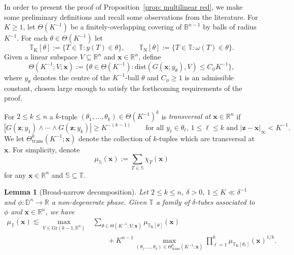 \documentclass[reqno]{amsart}
\numberwithin{equation}{section}
\newcommand{\B}{\mathbb{B}}
\newcommand{\D}{\mathbb{D}}
\newcommand{\R}{\mathbb{R}}
\newcommand{\T}{\mathbb{T}}
\newcommand{\bx}{\mathbf{x}}
\newcommand{\bz}{\mathbf{z}}
\theoremstyle{plain}
\newtheorem{lemma}[theorem]{Lemma}
\theoremstyle{definition}
\newcommand{\trans}{\mathrm{trans}}
\newcommand{\dist}{\mathrm{dist}}
\begin{document}
In order to present the proof of Proposition~\ref{prop: multilinear red}, we make some preliminary definitions and recall some observations from the literature. For $K \geq 1$, let $\Theta(K^{-1})$ be a finitely-overlapping covering of $\B^{n-1}$ by balls of radius $K^{-1}$. For each $\theta \in \Theta(K^{-1})$ let
\begin{equation*}
    \T_{\mathrm{K}}[\theta] := \big\{ T \in \T : y(T) \in \theta \big\}, \qquad \T_{\mathrm{N}}[\theta] := \big\{ T \in \T : \omega(T) \in \theta \big\}.
\end{equation*}
Given a linear subspace $V \subseteq \R^n$ and $\bx \in \R^n$, define
\begin{equation}\label{eq: V aligned caps}
    \Theta(K^{-1};V; \bx) := \big\{ \theta \in \Theta(K^{-1}) : \dist(G(\bx ;y_{\theta}), V) \leq C_{\phi} K^{-1} \big\},
\end{equation}
where $y_{\theta}$ denotes the centre of the $K^{-1}$-ball $\theta$ and $C_{\phi} \geq 1$ is an admissible constant, chosen large enough to satisfy the forthcoming requirements of the proof. 

For $2 \leq k \leq n$ a $k$-tuple $(\theta_1, \dots, \theta_k) \in \Theta(K^{-1})^k$ is \textit{transversal at $\bx \in \R^n$} if 
\begin{equation*}
    |G(\bz;y_1) \wedge \cdots \wedge G(\bz;y_k)| \geq K^{-(k-1)} \qquad \textrm{for all $y_{\ell} \in \theta_{\ell}$, $1 \leq \ell \leq k$ and $|\bz - \bx|_{\infty} < K^{-1}$.}
\end{equation*}
We let $\Theta^k_{\trans}(K^{-1}; \bx)$ denote the collection of $k$-tuples which are transversal at $\bx$. For simplicity, denote
\begin{equation*}
\mu_\mathbb{S}(\bx):=\sum_{T\in\mathbb{S}}\chi_T(\bx)
\end{equation*}
for any $\bx\in\R^n$ and $\mathbb{S}\subseteq\mathbb{T}$.
\begin{lemma}[Broad-narrow decomposition]\label{lem: b/n dec pointwise} Let $2 \leq k \leq n$, $\delta > 0$, $1 \leq K \ll \delta^{-1}$ and $\phi \colon \D^n \to \R$ a non-degenerate phase. Given $\T$ a family of $\delta$-tubes associated to $\phi$ and $\bx \in \R^n$, we have
\begin{align}\label{eq: b/n dec pointwise}
\mu_{\T}(\bx) \lesssim \max_{V \in \mathrm{Gr}(k-1,\R^n)} &\sum_{\theta \in \Theta(K^{-1}; V; \bx)}\mu_{\T_{\mathrm{K}}[\theta]}(\bx) \\
\nonumber
&\qquad + K^{n-1} \max_{(\theta_1, \dots, \theta_k) \in \Theta^k_{\trans}(K^{-1}; \bx)}  \prod_{\ell = 1}^k \mu_{\T_{\mathrm{K}}[\theta_{\ell}]}(\bx)^{1/k}.
\end{align}
\end{lemma}
\end{document}

